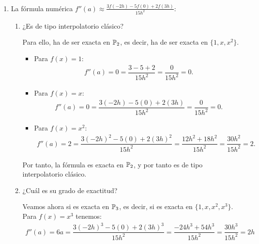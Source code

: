 \begin{ejercicio}\label{ej:2.1.22}~
    \begin{enumerate}
        \item La fórmula numérica $f''(a) \approx \frac{3f(-2h) - 5f(0) + 2f(3h)}{15h^2}$:
        \begin{enumerate}
            \item ¿Es de tipo interpolatorio clásico?
            
            Para ello, ha de ser exacta en $\mathbb{P}_2$, es decir, ha de ser exacta en $\{1,x,x^2\}$.
            \begin{itemize}
                \item Para $f(x) = 1$:
                \begin{align*}
                    f''(a) = 0 = \dfrac{3-5+2}{15h^2} = \dfrac{0}{15h^2} = 0.
                \end{align*}

                \item Para $f(x) = x$:
                \begin{align*}
                    f''(a) = 0 = \dfrac{3(-2h) - 5(0) + 2(3h)}{15h^2} = \dfrac{0}{15h^2} = 0.
                \end{align*}

                \item Para $f(x) = x^2$:
                \begin{align*}
                    f''(a) = 2 = \dfrac{3(-2h)^2 - 5(0) + 2(3h)^2}{15h^2} = \dfrac{12h^2 + 18h^2}{15h^2} = \dfrac{30h^2}{15h^2} = 2.
                \end{align*}
            \end{itemize}

            Por tanto, la fórmula es exacta en $\mathbb{P}_2$, y por tanto es de tipo interpolatorio clásico.
            \item ¿Cuál es su grado de exactitud?
            
            Veamos ahora si es exacta en $\mathbb{P}_3$, es decir, si es exacta en $\{1,x,x^2,x^3\}$. Para $f(x) = x^3$ tenemos:
            \begin{align*}
                f''(a) = 6a = \dfrac{3(-2h)^3 - 5(0) + 2(3h)^3}{15h^2} = \dfrac{-24h^3 + 54h^3}{15h^2} = \dfrac{30h^3}{15h^2} = 2h
            \end{align*}


\end{enumerate}
\end{enumerate}
\end{ejercicio}
